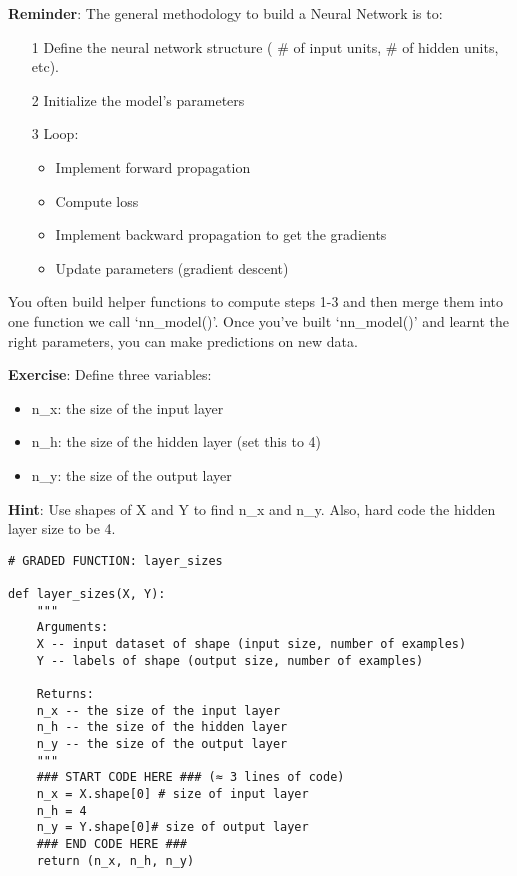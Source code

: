 {\textbf {Reminder}}: The general methodology to build a Neural Network is to:
\begin{itemize}
\item[1] Define the neural network structure ( \# of input units,  \# of hidden units, etc). 
\item[2] Initialize the model's parameters
\item[3] Loop:
\begin{itemize}
\item Implement forward propagation
\item Compute loss
\item Implement backward propagation to get the gradients
\item Update parameters (gradient descent)
\end{itemize}
\end{itemize}

You often build helper functions to compute steps 1-3 and then merge them into one function we call `nn\_model()'. Once you've built `nn\_model()' and learnt the right parameters, you can make predictions on new data.


\label{section4.1}

{\textbf {Exercise}}: Define three variables:
\begin{itemize}
\item n\_x: the size of the input layer
\item n\_h: the size of the hidden layer (set this to 4) 
\item n\_y: the size of the output layer
\end{itemize}

{\textbf {Hint}}: Use shapes of X and Y to find n\_x and n\_y. Also, hard code the hidden layer size to be 4.

\begin{verbatim}
# GRADED FUNCTION: layer_sizes

def layer_sizes(X, Y):
    """
    Arguments:
    X -- input dataset of shape (input size, number of examples)
    Y -- labels of shape (output size, number of examples)
    
    Returns:
    n_x -- the size of the input layer
    n_h -- the size of the hidden layer
    n_y -- the size of the output layer
    """
    ### START CODE HERE ### (≈ 3 lines of code)
    n_x = X.shape[0] # size of input layer
    n_h = 4
    n_y = Y.shape[0]# size of output layer
    ### END CODE HERE ###
    return (n_x, n_h, n_y)
\end{verbatim}



